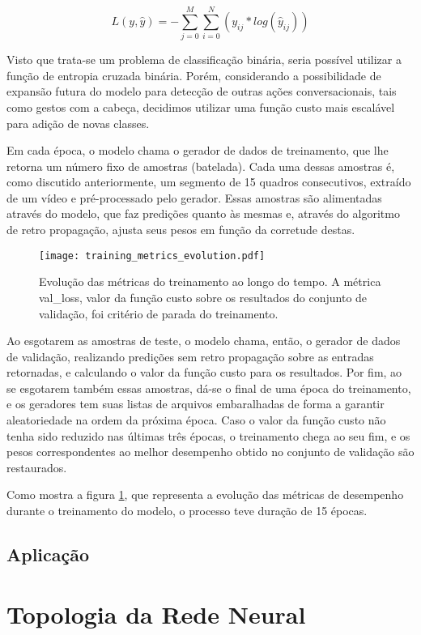 \begin{equation} \label{eq:categorical_crossentropy}
    L(y,\hat{y})=-\sum\limits_{j=0}^M\sum\limits_{i=0}^N(y_{ij}*log(\hat{y}_{ij}))
\end{equation}

Visto que trata-se um problema de classificação binária, seria possível utilizar a função de entropia cruzada binária. Porém, considerando a possibilidade de expansão futura do modelo para detecção de outras ações conversacionais, tais como gestos com a cabeça, decidimos utilizar uma função custo mais escalável para adição de novas classes.

Em cada época, o modelo chama o gerador de dados de treinamento, que lhe retorna um número fixo de amostras (batelada). Cada uma dessas amostras é, como discutido anteriormente, um segmento de 15 quadros consecutivos, extraído de um vídeo e pré-processado pelo gerador. Essas amostras são alimentadas através do modelo, que faz predições quanto às mesmas e, através do algoritmo de retro propagação, ajusta seus pesos em função da corretude destas.

\begin{figure}[ht]
    \centering
    \texttt{[image: training\_metrics\_evolution.pdf]}
    \caption{Evolução das métricas do treinamento ao longo do tempo. A métrica val\_loss, valor da função custo sobre os resultados do conjunto de validação, foi critério de parada do treinamento.}
    \label{fig:train_metrics_evo}
\end{figure}

Ao esgotarem as amostras de teste, o modelo chama, então, o gerador de dados de validação, realizando predições sem retro propagação sobre as entradas retornadas, e calculando o valor da função custo para os resultados. Por fim, ao se esgotarem também essas amostras, dá-se o final de uma época do treinamento, e os geradores tem suas listas de arquivos embaralhadas de forma a garantir aleatoriedade na ordem da próxima época. Caso o valor da função custo não tenha sido reduzido nas últimas três épocas, o treinamento chega ao seu fim, e os pesos correspondentes ao melhor desempenho obtido no conjunto de validação são restaurados.

Como mostra a figura \ref{fig:train_metrics_evo}, que representa a evolução das métricas de desempenho durante o treinamento do modelo, o processo teve duração de 15 épocas.

\subsection{Aplicação}
\label{subsec:application}

% 


\section{Topologia da Rede Neural}
\label{sec:topology}

